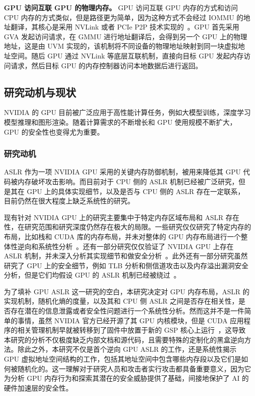 \textbf{GPU 访问互联 GPU 的物理内存。}
GPU 访问互联 GPU 内存的方式和访问 CPU 内存的方式类似，但是路径更为简单，因为这种方式不会经过 IOMMU 的地址翻译，其核心是采用 NVLink 或者 PCIe P2P 技术实现的~\cite{foley2017ultra}。GPU 首先采用 GVA 发起访问请求，在 GMMU 进行地址翻译后，会得到另一个 GPU 上的物理地址，这是由 UVM 实现的，该机制将不同设备的物理地址映射到同一块虚拟地址空间。随后 GPU 通过 NVLink 等底层互联机制，直接向目标 GPU 发起内存访问请求，然后目标 GPU 的内存控制器访问本地数据后进行返回。

\subsection{研究动机与现状}
NVIDIA 的 GPU 目前被广泛应用于高性能计算任务，例如大模型训练，深度学习模型推理和图形渲染。随着计算需求的不断增长和 GPU 使用规模不断扩大，GPU 的安全性也变得尤为重要。

\subsubsection{研究动机}
ASLR 作为一项 NVIDIA GPU 采用的关键内存防御机制，被用来降低其 GPU 代码被内存破坏攻击影响。而目前对于 CPU 侧的 ASLR 机制已经被广泛研究，但是其在 GPU 上的具体实现细节，以及是否与 CPU 侧的 ASLR 存在一定联系，目前仍然在很大程度上缺乏系统性的研究。

现有针对 NVIDIA GPU 上的研究主要集中于特定内存区域布局和 ASLR 存在性，在研究范围和研究深度仍然存在极大的局限。一些研究仅仅研究了特定内存的布局，比如栈和 CUDA 库的内存布局，并未对整体的 GPU 内存布局进行一个整体性逆向和系统性分析~\cite{yanan:profit_for_fun,park2020mind}。还有一部分研究仅仅验证了 NVIDIA GPU 上存在 ASLR 机制，并未深入分析其实现细节和做安全分析~\cite{zhang2022lak,mittal2018survey,hoover2022analysis,cismaru2023study}。此外还有一部分研究虽然研究了 GPU 上的安全细节，例如 TLB 分析和侧信道攻击以及内存溢出漏洞安全分析，但是它们均假设 GPU 的 ASLR 机制已经被绕过~\cite{Zhang:2023:CCS,yanan:profit_for_fun}。

为了填补 GPU ASLR 这一研究的空白，本研究决定对 GPU 内存布局，ASLR 的实现机制，随机化熵的度量，以及其和 CPU 侧 ASLR 之间是否存在相关性，是否存在潜在的信息泄露或者安全性问题进行一个系统性分析。然而这并不是一件简单的事情，虽然 NVIDIA 官方已经开源了其 GPU 内核模块，但是 CUDA 应用程序的相关管理机制早就被转移到了固件中放置于新的 GSP 核心上运行~\cite{nvidia_open_gpu_kernel_modules,nvidia_gsp_510_2022}，这导致本研究的分析不仅极度缺乏内部文档和源代码，且需要特殊的定制化的黑盒逆向方法。除此之外，本研究不仅是首个逆向 GPU ASLR 的工作，还是系统性揭示 GPU 虚拟地址空间结构的工作，包括其地址空间中包含哪些内存段以及它们是如何被随机化的。这一理解对于研究人员和攻击者实行攻击都具备重要意义，因为它为分析 GPU 内存行为和探索其潜在的安全威胁提供了基础，间接地保护了 AI 的硬件加速层的安全性。

